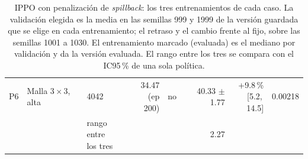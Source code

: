 \begin{table}[H]
\begin{tabular}{lllrlrrr}
P6 & \makecell[l]{Malla $3 \times 3$,\\{}alta} & 4042 & \makecell[r]{34.47\\{}(ep 200)} & no & \makecell[r]{40.33\\{}$\pm$ 1.77} & \makecell[r]{+9.8\,\%\\{}[5.2,\,14.5]} & 0.00218 \\
 & & \makecell[l]{rango entre\\{}los tres} & & & 2.27 & & \\
\bottomrule
\end{tabular}
\caption[Entrenamientos de IPPO con penalización de \textit{spillback}]{IPPO con penalización de \textit{spillback}: los tres entrenamientos de cada caso. La validación elegida es la media en las semillas 999 y 1999 de la versión guardada que se elige en cada entrenamiento; el retraso y el cambio frente al fijo, sobre las semillas 1001 a 1030. El entrenamiento marcado (evaluada) es el mediano por validación y da la versión evaluada. El rango entre los tres se compara con el IC95\,\% de una sola política.}
\label{tab:veredicto-bases-ippo-spill}
\end{table}

